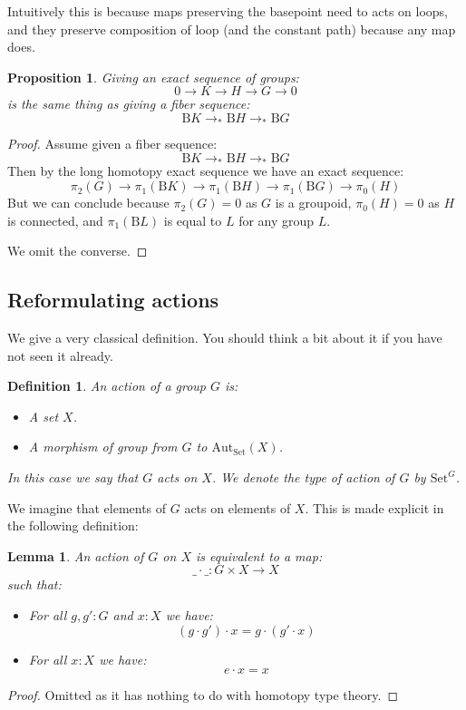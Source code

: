\documentclass{article}
\newcommand{\sse}[1]{\medbreak \subsection{#1}}
\renewcommand{\r}{\rightarrow}
\newcommand{\B}{\mathrm{B}}
\newcommand{\Aut}{\mathrm{Aut}}
\newcommand{\Set}{\mathrm{Set}}
\newtheorem{lemma}{Lemma}
\newtheorem{definition}{Definition}
\newtheorem{proposition}{Proposition}
\begin{document}
Intuitively this is because maps preserving the basepoint need to acts on loops, and they preserve composition of loop (and the constant path) because any map does.

\begin{proposition}
Giving an exact sequence of groups:
\[0\r K \r H\r  G\r 0 \]
is the same thing as giving a fiber sequence:
\[\B K \r_*\B H\r_*\B G\]
\end{proposition}
\begin{proof}
Assume given a fiber sequence:
\[\B K \r_*\B H\r_*\B G\]
Then by the long homotopy exact sequence we have an exact sequence:
\[\pi_2(G)\r \pi_1(\B K) \r \pi_1(\B H) \r \pi_1(\B G) \r \pi_0(H)\]
But we can conclude because $\pi_2(G) = 0$ as $G$ is a groupoid, $\pi_0(H) = 0$ as $H$ is connected, and $\pi_1(\B L)$ is equal to $L$ for any group $L$.
 
We omit the converse.
\end{proof}



\sse{Reformulating actions}

We give a very classical definition. You should think a bit about it if you have not seen it already.

\begin{definition}
An action of a group $G$ is:
\begin{itemize}
\item A set $X$.
\item A morphism of group from $G$ to $\Aut_\Set(X)$.
\end{itemize}
In this case we say that $G$ acts on $X$. We denote the type of action of $G$ by $\Set^G$.
\end{definition}

We imagine that elements of $G$ acts on elements of $X$. This is made explicit in the following definition:

\begin{lemma}
An action of $G$ on $X$ is equivalent to a map:
\[\_\cdot\_ : G\times X \r X\]
such that:
\begin{itemize}
\item For all $g,g':G$ and $x:X$ we have:
\[(g\cdot g')\cdot x = g\cdot (g'\cdot x)\]
\item For all $x:X$ we have:
\[e\cdot x = x\]
\end{itemize} 
\end{lemma}
\begin{proof}
Omitted as it has nothing to do with homotopy type theory.
\end{proof}
\end{document}
